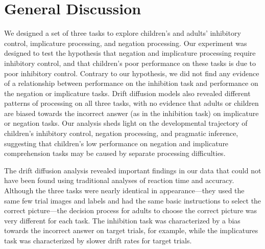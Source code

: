 \documentclass[10pt,letterpaper]{article}
\newcommand{\ejy}[1]{\textcolor{Blue}{[ejy: #1]}}
\newcommand{\aen}[1]{\textcolor{DarkOrange}{[aen: #1]}}
\begin{document}
\section{General Discussion}

We designed a set of three tasks to explore children's and adults' inhibitory control, implicature processing, and negation processing. Our experiment was designed to test the hypothesis that negation and implicature processing require inhibitory control, and that children's poor performance on these tasks is due to poor inhibitory control. Contrary to our hypothesis, we did not find any evidence of a relationship between performance on the inhibition task and performance on the negation or implicature tasks. Drift diffusion models also revealed different patterns of processing on all three tasks, with no evidence that adults or children are biased towards the incorrect answer (as in the inhibition task) on implicature or negation tasks. Our analysis sheds light on the developmental trajectory of children's inhibitory control, negation processing, and pragmatic inference, suggesting that children's low performance on negation and implicature comprehension tasks may be caused by separate processing difficulties.

The drift diffusion analysis revealed important findings in our data that could not have been found using traditional analyses of reaction time and accuracy. Although the three tasks were nearly identical in appearance---they used the same few trial images and labels and had the same basic instructions to select the correct picture---the decision process for adults to choose the correct picture was very different for each task. The inhibition task was characterized by a bias towards the incorrect answer on target trials, for example, while the implicatures task was characterized by slower drift rates for target trials.
\end{document}
